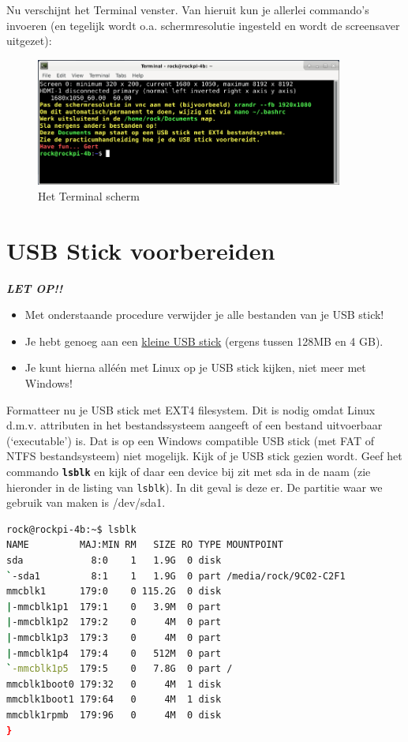 Nu verschijnt het Terminal venster. Van hieruit kun je allerlei commando's invoeren (en tegelijk wordt o.a. schermresolutie ingesteld en wordt de screensaver uitgezet):
\begin{figure}[h!]
	\centering
	\begin{center} 
		\includegraphics[width=0.9\textwidth]{figuren/terminal-inlogscherm}	
		\caption{Het Terminal scherm}
		\label{fig:terminal-inlogscherm}   
	\end{center}
\end{figure}

\hypertarget{chp:USBstick}{}
\section{USB Stick voorbereiden}
\textbf{\textit{LET OP!! }}
\begin{itemize}
	\item Met onderstaande procedure verwijder je alle bestanden van je USB stick!
	\item Je hebt genoeg aan een \hyperlink{USBinleiding}{kleine USB stick} (ergens tussen 128MB en 4 GB).
	\item Je kunt hierna alléén met Linux op je USB stick kijken, niet meer met Windows!
\end{itemize}

Formatteer nu je USB stick met EXT4 filesystem. Dit is nodig omdat Linux d.m.v. attributen in het bestandssysteem aangeeft of een bestand uitvoerbaar (‘executable’) is. Dat is op  een Windows compatible USB stick (met FAT of NTFS bestandsysteem) niet mogelijk.
Kijk of je USB stick gezien wordt. Geef het commando \textbf{\texttt{lsblk}} en kijk of daar een device bij zit met sda in de naam (zie hieronder in de listing van \texttt{lsblk}). In dit geval is deze er. De partitie waar we gebruik van maken is /dev/sda1.

\begin{lstlisting}[language=bash]
rock@rockpi-4b:~$ lsblk
NAME         MAJ:MIN RM   SIZE RO TYPE MOUNTPOINT
sda            8:0    1   1.9G  0 disk
`-sda1         8:1    1   1.9G  0 part /media/rock/9C02-C2F1
mmcblk1      179:0    0 115.2G  0 disk
|-mmcblk1p1  179:1    0   3.9M  0 part
|-mmcblk1p2  179:2    0     4M  0 part
|-mmcblk1p3  179:3    0     4M  0 part
|-mmcblk1p4  179:4    0   512M  0 part
`-mmcblk1p5  179:5    0   7.8G  0 part /
mmcblk1boot0 179:32   0     4M  1 disk
mmcblk1boot1 179:64   0     4M  1 disk
mmcblk1rpmb  179:96   0     4M  0 disk
}
\end{lstlisting}
	
